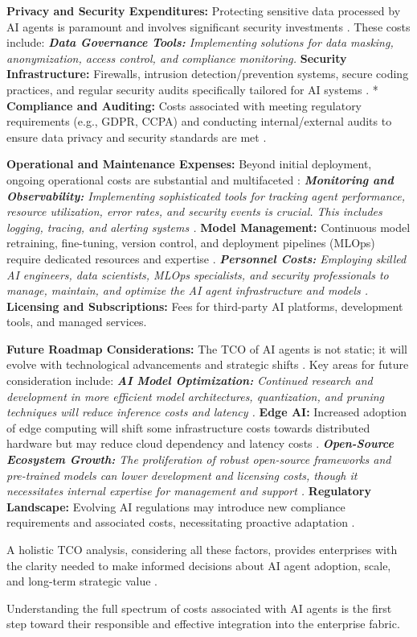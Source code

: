 \textbf{Privacy and Security Expenditures:} Protecting sensitive data processed by AI agents is paramount and involves significant security investments \cite{Reger2026}. These costs include: \textit{   \textbf{Data Governance Tools:} Implementing solutions for data masking, anonymization, access control, and compliance monitoring. }   \textbf{Security Infrastructure:} Firewalls, intrusion detection/prevention systems, secure coding practices, and regular security audits specifically tailored for AI systems \cite{Gartner2025}. *   \textbf{Compliance and Auditing:} Costs associated with meeting regulatory requirements (e.g., GDPR, CCPA) and conducting internal/external audits to ensure data privacy and security standards are met \cite{Reger2026}.

\textbf{Operational and Maintenance Expenses:} Beyond initial deployment, ongoing operational costs are substantial and multifaceted \cite{Reger2026}: \textit{   \textbf{Monitoring and Observability:} Implementing sophisticated tools for tracking agent performance, resource utilization, error rates, and security events is crucial. This includes logging, tracing, and alerting systems \cite{Gartner2025}. }   \textbf{Model Management:} Continuous model retraining, fine-tuning, version control, and deployment pipelines (MLOps) require dedicated resources and expertise \cite{Reger2026}. \textit{   \textbf{Personnel Costs:} Employing skilled AI engineers, data scientists, MLOps specialists, and security professionals to manage, maintain, and optimize the AI agent infrastructure and models \cite{Gartner2025}. }   \textbf{Licensing and Subscriptions:} Fees for third-party AI platforms, development tools, and managed services.

\textbf{Future Roadmap Considerations:} The TCO of AI agents is not static; it will evolve with technological advancements and strategic shifts \cite{Reger2026}. Key areas for future consideration include: \textit{   \textbf{AI Model Optimization:} Continued research and development in more efficient model architectures, quantization, and pruning techniques will reduce inference costs and latency \cite{Gartner2025}. }   \textbf{Edge AI:} Increased adoption of edge computing will shift some infrastructure costs towards distributed hardware but may reduce cloud dependency and latency costs \cite{Reger2026}. \textit{   \textbf{Open-Source Ecosystem Growth:} The proliferation of robust open-source frameworks and pre-trained models can lower development and licensing costs, though it necessitates internal expertise for management and support \cite{Gartner2025}. }   \textbf{Regulatory Landscape:} Evolving AI regulations may introduce new compliance requirements and associated costs, necessitating proactive adaptation \cite{Reger2026}.

A holistic TCO analysis, considering all these factors, provides enterprises with the clarity needed to make informed decisions about AI agent adoption, scale, and long-term strategic value \cite{Reger2026}.

Understanding the full spectrum of costs associated with AI agents is the first step toward their responsible and effective integration into the enterprise fabric.
